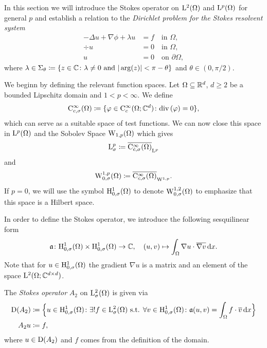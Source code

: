 In this section we will introduce the Stokes operator on $\mathrm{L}^2(\Omega)$ and $\mathrm{L}^p(\Omega)$ for general $p$ and establish a relation to the \emph{Dirichlet problem for the Stokes resolvent system}
\begin{align}
  -\Delta u + \nabla \phi + \lambda u &= f  \quad\text{in } \Omega, \nonumber\\
  \div u &= 0 \quad\text{in } \Omega, \label{eq:stokesResolventSystem} \\
  u &= 0 \quad\text{on } \partial\Omega, \nonumber
\end{align}
where $\lambda \in \Sigma_\theta \coloneqq \{ z \in \mathbb{C} \colon \lambda \neq 0 \text{ and } |\arg(z) | < \pi - \theta \}$ and $\theta \in (0, \pi/2)$.

We beginn by defining the relevant function spaces.
Let $\Omega \subseteq \mathbb{R}^d$, $d \geq 2$ be a bounded Lipschitz domain and $1 < p < \infty$. 
We define
\begin{align*}
  \mathrm{C}_{c, \sigma}^\infty(\Omega) \coloneqq \{ \varphi \in \mathrm{C}_c^\infty(\Omega; \mathbb{C}^d) \colon \mathrm{div\,} (\varphi) = 0 \},
\end{align*}
which can serve as a suitable space of test functions.
We can now close this space in $\mathrm{L}^p(\Omega)$ and the Sobolev Space $\mathrm{W}_{1,p}(\Omega)$ which gives
\begin{align*}
  \mathrm{L}_\sigma^p \coloneqq \overline{\mathrm{C}_{c,\sigma}^\infty(\Omega)}_{\mathrm{L}^p}
\end{align*}
and
\begin{align*}
  \mathrm{W}_{0,\sigma}^{1,p}(\Omega) \coloneqq \overline{\mathrm{C}_{c,\sigma}^\infty(\Omega)}_{\mathrm{W}^{1,p}}.
\end{align*}
If $p = 0$, we will use the symbol $\mathrm{H}_{0,\sigma}^1(\Omega)$ to denote $\mathrm{W}_{0,\sigma}^{1,2}(\Omega)$ to emphasize that this space is a Hilbert space.

In order to define the Stokes operator, we introduce the following sesquilinear form
\begin{align*}
  \mathfrak{a} \colon \mathrm{H}_{0,\sigma}^1(\Omega) \times \mathrm{H}_{0,\sigma}^1(\Omega) \to \mathbb{C}, \quad (u,v) \mapsto \int_\Omega \nabla u \cdot \overline{\nabla v} \, {\operatorname{d}\!{x}}.
\end{align*}
Note that for $u \in \mathrm{H}_{0,\sigma}^1(\Omega)$ the gradient $\nabla u$ is a matrix and an element of the space $\mathrm{L}^2(\Omega; \mathbb{C}^{d \times d})$.

\begin{defn}
  \label{defn:stokes}
  The \emph{Stokes operator} $A_2$ on $\mathrm{L}_\sigma^2(\Omega)$ is given via
  \begin{align*}
    \mathrm{D}(A_2) &\coloneqq \Big\{ u \in \mathrm{H}_{0,\sigma}^1(\Omega) \colon \exists ! f \in \mathrm{L}^2_\sigma(\Omega) \text{ s.t. } \forall v \in \mathrm{H}_{0,\sigma}^1(\Omega) \colon \mathfrak{a}(u,v) = \int_\Omega f \cdot \overline v \, {\operatorname{d}\!{x}} \Big\} \\
    A_2 u &\coloneqq f,
  \end{align*}
  where $u \in \mathrm{D}(A_2)$ and $f$ comes from the definition of the domain.
\end{defn}

